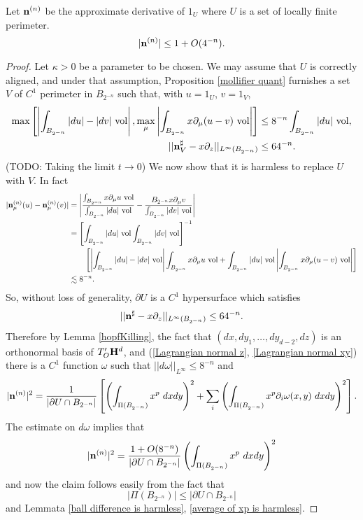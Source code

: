 \begin{lemma}\label{normal has length 1}
Let $\mathbf n^{(n)}$ be the approximate derivative of $1_U$ where $U$ is a set of locally finite perimeter.
$$|\mathbf n^{(n)}| \leq 1 + O(4^{-n}).$$
\end{lemma}
\begin{proof}
Let $\kappa > 0$ be a parameter to be chosen.
We may assume that $U$ is correctly aligned, and under that assumption, Proposition \ref{mollifier quant} furnishes a set $V$ of $C^1$ perimeter in $B_{2^{-n}}$ such that, with $u = 1_U$, $v = 1_V$,
\begin{align*}
\max\left[\left|\int_{B_{2^{-n}}} |du| - |dv| ~\mathrm{vol}\right|, \max_\mu \left|\int_{B_{2^{-n}}} x\partial_\mu(u - v) ~\mathrm{vol}\right|\right] &\leq 8^{-n} \int_{B_{2^{-n}}} |du| ~\mathrm{vol}, \\
||\mathbf n^\sharp_V - x\partial_z||_{L^\infty(B_{2^{-n}})} &\leq 64^{-n}.
\end{align*}
(TODO: Taking the limit $t \to 0$)
We now show that it is harmless to replace $U$ with $V$. In fact
\begin{align*}
|\mathbf n^{(n)}_\mu(u) - \mathbf n^{(n)}_\mu(v)|
&= \left|\frac{\int_{B_{2^{-n}}} x\partial_\mu u ~\mathrm{vol}}{\int_{B_{2^{-n}}} |du| ~\mathrm{vol}} - \frac{B_{2^{-n}} x\partial_\mu v}{\int_{B_{2^{-n}}} |dv| ~\mathrm{vol}}\right|\\
&= \left[\int_{B_{2^{-n}}} |du| ~\mathrm{vol} \int_{B_{2^{-n}}} |dv| ~\mathrm{vol}\right]^{-1} \\
&\qquad \left[\left|\int_{B_{2^{-n}}} |du| - |dv| ~\mathrm{vol}\right| \int_{B_{2^{-n}}} x\partial_\mu u ~\mathrm{vol}+ \int_{B_{2^{-n}}} |du| ~\mathrm{vol} \left|\int_{B_{2^{-n}}} x\partial_\mu(u - v) ~\mathrm{vol}\right|\right] \\
&\lesssim 8^{-n}.
\end{align*}
So, without loss of generality, $\partial U$ is a $C^1$ hypersurface which satisfies
$$||\mathbf n^\sharp - x\partial_z||_{L^\infty(B_{2^{-n}})} \leq 64^{-n}.$$
Therefore by Lemma \ref{hopfKilling}, the fact that $(dx, dy_1, \dots, dy_{d-2}, dz)$ is an orthonormal basis of $T'_O\mathbf H^d$, and (\ref{Lagrangian normal z}, \ref{Lagrangian normal xy}) there is a $C^1$ function $\omega$ such that $||d\omega||_{L^\infty} \leq 8^{-n}$ and
$$|\mathbf n^{(n)}|^2 = \frac{1}{|\partial U \cap B_{2^{-n}}|} \left[\left(\int_{\Pi(B_{2^{-n}})} x^p ~dxdy\right)^2 + \sum_i \left(\int_{\Pi(B_{2^{-n}})} x^p \partial_i \omega(x, y) ~dxdy\right)^2\right].$$
The estimate on $d\omega$ implies that
$$|\mathbf n^{(n)}|^2 = \frac{1 + O(8^{-n})}{|\partial U \cap B_{2^{-n}}|}\left(\int_{\Pi(B_{2^{-n}})} x^p ~dxdy\right)^2$$
and now the claim follows easily from the fact that 
$$|\Pi(B_{2^{-n}})| \leq |\partial U \cap B_{2^{-n}}|$$
and Lemmata \ref{ball difference is harmless}, \ref{average of xp is harmless}.
\end{proof}

